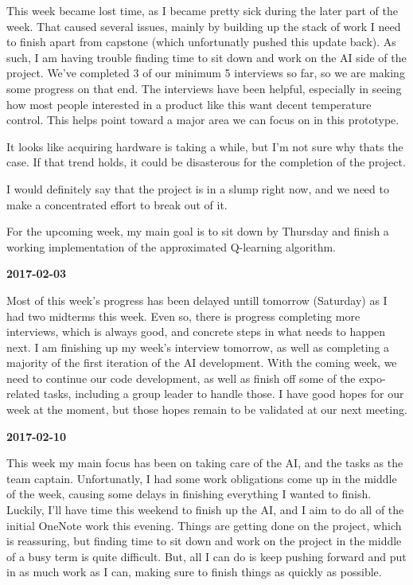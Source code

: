 This week became lost time, as I became pretty sick during the later part of the week.
That caused several issues, mainly by building up the stack of work I need to finish apart from capstone (which unfortunatly pushed this update back).
As such, I am having trouble finding time to sit down and work on the AI side of the project.
We've completed 3 of our minimum 5 interviews so far, so we are making some progress on that end.
The interviews have been helpful, especially in seeing how most people interested in a product like this want decent temperature control.
This helps point toward a major area we can focus on in this prototype.

It looks like acquiring hardware is taking a while, but I'm not sure why thats the case.
If that trend holds, it could be disasterous for the completion of the project.

I would definitely say that the project is in a slump right now, and we need to make a concentrated effort to break out of it.

For the upcoming week, my main goal is to sit down by Thursday and finish a working implementation of the approximated Q-learning algorithm.

\textbf{2017-02-03} 

Most of this week's progress has been delayed untill tomorrow (Saturday) as I had two midterms this week.
Even so, there is progress completing more interviews, which is always good, and concrete steps in what needs to happen next.
I am finishing up my week's interview tomorrow, as well as completing a majority of the first iteration of the AI development.
With the coming week, we need to continue our code development, as well as finish off some of the expo-related tasks, including a group leader to handle those.
I have good hopes for our week at the moment, but those hopes remain to be validated at our next meeting.

\textbf{2017-02-10} 

This week my main focus has been on taking care of the AI, and the tasks as the team captain. 
Unfortunatly, I had some work obligations come up in the middle of the week, causing some delays in finishing everything I wanted to finish. Luckily, I'll have time this weekend to finish up the AI, and I aim to do all of the initial OneNote work this evening.
Things are getting done on the project, which is reassuring, but finding time to sit down and work on the project in the middle of a busy term is quite difficult.
But, all I can do is keep pushing forward and put in as much work as I can, making sure to finish things as quickly as possible.

